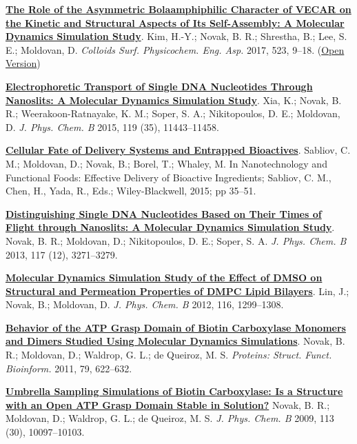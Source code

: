 \begin{cventries}
{\begin{cvitems}
        \item {\href{https://doi.org/10.1016/j.colsurfa.2017.03.060}{\textbf{The Role of the Asymmetric Bolaamphiphilic Character of VECAR on the Kinetic and Structural Aspects of Its Self-Assembly: A Molecular Dynamics Simulation Study}}. Kim, H.-Y.; Novak, B. R.; Shrestha, B.; Lee, S. E.; Moldovan, D. \textit{Colloids Surf. Physicochem. Eng. Asp.} 2017, 523, 9–18. (\href{https://www.sciencedirect.com/science/article/am/pii/S0927775717303205}{Open Version})}
        \item {\href{https://doi.org/10.1021/acs.jpcb.5b02798}{\textbf{Electrophoretic Transport of Single DNA Nucleotides Through Nanoslits: A Molecular Dynamics Simulation Study}}. Xia, K.; Novak, B. R.; Weerakoon-Ratnayake, K. M.; Soper, S. A.; Nikitopoulos, D. E.; Moldovan, D. \textit{J. Phys. Chem. B} 2015, 119 (35), 11443–11458. }
        \item {\href{https://doi.org/10.1002/9781118462157.ch3}{\textbf{Cellular Fate of Delivery Systems and Entrapped Bioactives}}. Sabliov, C. M.; Moldovan, D.; Novak, B.; Borel, T.; Whaley, M. In Nanotechnology and Functional Foods: Effective Delivery of Bioactive Ingredients; Sabliov, C. M., Chen, H., Yada, R., Eds.; Wiley-Blackwell, 2015; pp 35–51.}
        \item {\href{https://doi.org/10.1021/jp309486c}{\textbf{Distinguishing Single DNA Nucleotides Based on Their Times of Flight through Nanoslits: A Molecular Dynamics Simulation Study}}. Novak, B. R.; Moldovan, D.; Nikitopoulos, D. E.; Soper, S. A. \textit{J. Phys. Chem. B} 2013, 117 (12), 3271–3279. }
        \item {\href{https://doi.org/10.1021/jp208145b}{\textbf{Molecular Dynamics Simulation Study of the Effect of DMSO on Structural and Permeation Properties of DMPC Lipid Bilayers}}. Lin, J.; Novak, B.; Moldovan, D. \textit{J. Phys. Chem. B} 2012, 116, 1299–1308.}
        \item {\href{https://doi.org/10.1002/prot.22910}{\textbf{Behavior of the ATP Grasp Domain of Biotin Carboxylase Monomers and Dimers Studied Using Molecular Dynamics Simulations}}. Novak, B. R.; Moldovan, D.; Waldrop, G. L.; de Queiroz, M. S. \textit{Proteins: Struct. Funct. Bioinform.} 2011, 79, 622–632.}
        \item{\href{https://doi.org/10.1021/jp810650q}{\textbf{Umbrella Sampling Simulations of Biotin Carboxylase: Is a Structure with an Open ATP Grasp Domain Stable in Solution?}} Novak, B. R.; Moldovan, D.; Waldrop, G. L.; de Queiroz, M. S. \textit{J. Phys. Chem. B} 2009, 113 (30), 10097–10103.}

\end{cvitems}}
\end{cventries}
